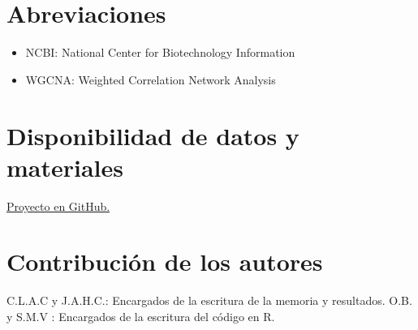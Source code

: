 \documentclass{bmcart}
\begin{document}
	\begin{backmatter}
	
		\section*{Abreviaciones}%
			\begin{itemize}
				\item NCBI: National Center for Biotechnology Information
				\item WGCNA: Weighted Correlation Network Analysis
			\end{itemize}
		
		\section*{Disponibilidad de datos y materiales}%
			\href{https://github.com/smv762e/infectionResponse\_SARS-CoV2}{Proyecto en GitHub.}
					
		\section*{Contribución de los autores}
			C.L.A.C y J.A.H.C.: Encargados de la escritura de la memoria y resultados.
			\newline
			O.B. y S.M.V : Encargados de la escritura del código en R.

		
		
	
	\end{backmatter}
\end{document}
